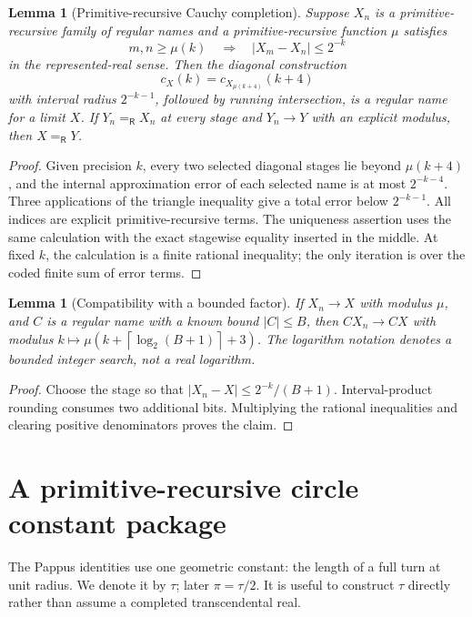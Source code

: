 \documentclass[11pt]{article}
\newtheorem{lemma}[theorem]{Lemma}
\theoremstyle{definition}
\newcommand{\Eq}{\mathrel{=_{\!\mathsf R}}}
\newcommand{\abs}[1]{\left|#1\right|}
\newcommand{\ceil}[1]{\left\lceil #1\right\rceil}
\begin{document}
\begin{lemma}[Primitive-recursive Cauchy completion]
\label{lem:pr-limit}
Suppose \(X_n\) is a primitive-recursive family of regular names and a
primitive-recursive function \(\mu\) satisfies
\[
 m,n\geq\mu(k)\quad\Longrightarrow\quad
 \abs{X_m-X_n}\leq2^{-k}
\]
in the represented-real sense.  Then the diagonal construction
\[
 c_X(k)=c_{X_{\mu(k+4)}}(k+4)
\]
with interval radius \(2^{-k-1}\), followed by running intersection, is a
regular name for a limit \(X\).  If \(Y_n\Eq X_n\) at every stage and
\(Y_n\to Y\) with an explicit modulus, then \(X\Eq Y\).
\end{lemma}

\begin{proof}
Given precision \(k\), every two selected diagonal stages lie beyond
\(\mu(k+4)\), and the internal approximation error of each selected name is at
most \(2^{-k-4}\).  Three applications of the triangle inequality give a
total error below \(2^{-k-1}\).  All indices are explicit primitive-recursive
terms.  The uniqueness assertion uses the same calculation with the exact
stagewise equality inserted in the middle.  At fixed \(k\), the calculation is
a finite rational inequality; the only iteration is over the coded finite
sum of error terms.
\end{proof}

\begin{lemma}[Compatibility with a bounded factor]
\label{lem:bounded-factor}
If \(X_n\to X\) with modulus \(\mu\), and \(C\) is a regular name with a
known bound \(\abs C\leq B\), then \(CX_n\to CX\) with modulus
\(k\mapsto\mu(k+\ceil{\log_2(B+1)}+3)\).  The logarithm notation denotes a
bounded integer search, not a real logarithm.
\end{lemma}

\begin{proof}
Choose the stage so that \(\abs{X_n-X}\leq2^{-k}/(B+1)\).  Interval-product
rounding consumes two additional bits.  Multiplying the rational inequalities
and clearing positive denominators proves the claim.
\end{proof}

\section{A primitive-recursive circle constant package}
\label{sec:circle}

The Pappus identities use one geometric constant: the length of a full turn
at unit radius.  We denote it by \(\tau\); later \(\pi=\tau/2\).  It is useful
to construct \(\tau\) directly rather than assume a completed transcendental
real.
\end{document}
